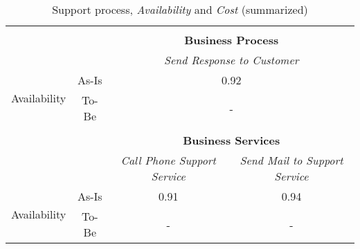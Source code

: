 \begin{table}[H]
\begin{tabular}{|c|c|p{2cm}|p{2.5cm}|p{2.5cm}|p{2.5cm}|}
		\multicolumn{6}{c}{} \\ \cline{3-6}
		\multicolumn{2}{c}{} & \multicolumn{4}{|c|}{\textbf{Business Process}} \\ \cline{3-6}
		\multicolumn{2}{c|}{} & \multicolumn{4}{|c|}{\textsl{Send Response to Customer}}\\ \hline
		\multirow{2}{*}{Availability} & As-Is & \multicolumn{4}{|c|}{0.92}\\ \cline{2-6}
									   & To-Be & \multicolumn{4}{|c|}{-}\\ \hline
		\multicolumn{6}{c}{} \\ \cline{3-6}
		\multicolumn{2}{c}{} & \multicolumn{4}{|c|}{\textbf{Business Services}} \\ \cline{3-6}
		\multicolumn{2}{c|}{} & \multicolumn{2}{|c|}{\textsl{Call Phone Support Service}} & \multicolumn{2}{|c|}{\textsl{Send Mail to Support Service}}\\ \hline
		\multirow{2}{*}{Availability} & As-Is & \multicolumn{2}{|c|}{0.91} & \multicolumn{2}{|c|}{0.94}\\ \cline{2-6}
									   & To-Be & \multicolumn{2}{|c|}{-} & \multicolumn{2}{|c|}{-}\\ \hline
	\end{tabular}
\caption{Support process, \textsl{Availability} and \textsl{Cost} (summarized)} 
\label{tab:support_both}
\end{table}